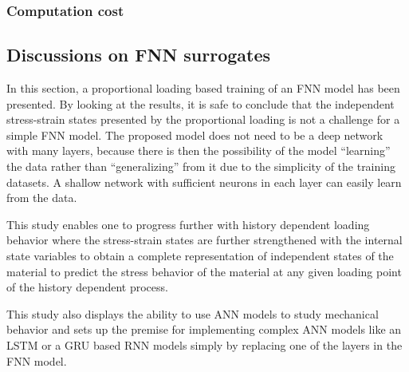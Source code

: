 \subsubsection{Computation cost}

\subsection{Discussions on FNN surrogates}\label{nn-mono-discussion}
In this section, a proportional loading based training of an FNN model has been presented. By looking at the results, it is safe to conclude that the independent stress-strain states presented by the proportional loading is not a challenge for a simple FNN model. The proposed model does not need to be a deep network with many layers, because there is then the possibility of the model ``learning'' the data rather than ``generalizing'' from it due to the simplicity of the training datasets. A shallow network with sufficient neurons in each layer can easily learn from the data.

This study enables one to progress further with history dependent loading behavior where the stress-strain states are further strengthened with the internal state variables to obtain a complete representation of independent states of the material to predict the stress behavior of the material at any given loading point of the history dependent process.

This study also displays the ability to use ANN models to study mechanical behavior and sets up the premise for implementing complex ANN models like an LSTM or a GRU based RNN models simply by replacing one of the layers in the FNN model.


